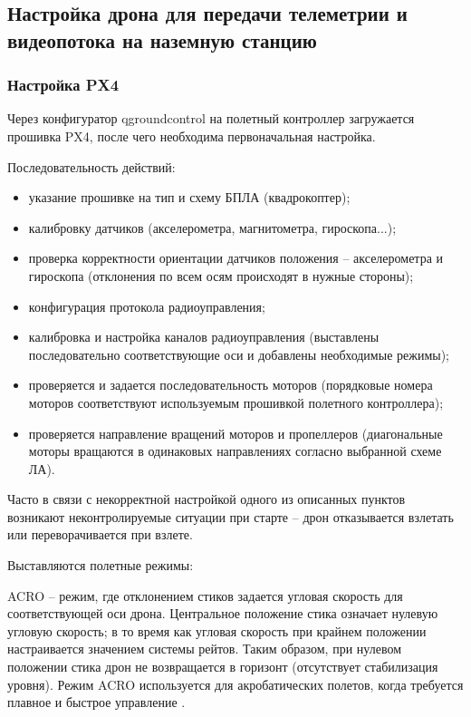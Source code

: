 \subsection{Настройка дрона для передачи телеметрии и видеопотока на наземную станцию}

\subsubsection{Настройка PX4}
Через конфигуратор qgroundcontrol на полетный контроллер загружается прошивка PX4, после чего необходима первоначальная настройка.

Последовательность действий:
\begin{itemize}
	\item указание прошивке на тип и схему БПЛА (квадрокоптер);
	\item калибровку датчиков (акселерометра, магнитометра, гироскопа...);
	\item проверка корректности ориентации датчиков положения -- акселерометра и гироскопа (отклонения по всем осям происходят в нужные стороны);
	\item конфигурация протокола радиоуправления;
	\item калибровка и настройка каналов радиоуправления (выставлены последовательно соответствующие оси и добавлены необходимые режимы);
	\item проверяется и задается последовательность моторов (порядковые номера моторов соответствуют используемым прошивкой полетного контроллера);
	\item проверяется направление вращений моторов и пропеллеров (диагональные моторы вращаются в одинаковых направлениях согласно выбранной схеме ЛА).
\end{itemize}

Часто в связи с некорректной настройкой одного из описанных пунктов возникают неконтролируемые ситуации при старте -- дрон отказывается взлетать или переворачивается при взлете.

Выставляются полетные режимы:

ACRO -- режим, где отклонением стиков задается угловая скорость для соответствующей оси дрона. Центральное положение стика означает нулевую угловую скорость; в то время как угловая скорость при крайнем положении настраивается значением системы рейтов. Таким образом, при нулевом положении стика дрон не возвращается в горизонт (отсутствует стабилизация уровня). Режим ACRO используется для акробатических полетов, когда требуется плавное и быстрое управление \cite{ardupilot}.

